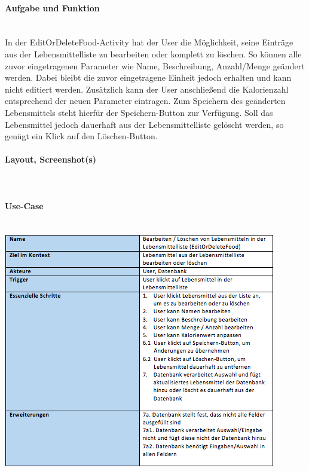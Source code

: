 \paragraph{Aufgabe und Funktion}\\
In der EditOrDeleteFood-Activity hat der User die Möglichkeit, seine Einträge aus der Lebensmittelliste zu bearbeiten oder komplett zu löschen. So können alle zuvor eingetragenen Parameter wie Name, Beschreibung, Anzahl/Menge geändert werden. Dabei bleibt die zuvor eingetragene Einheit jedoch erhalten und kann nicht editiert werden. Zusätzlich kann der User anschließend die Kalorienzahl entsprechend der neuen Parameter eintragen. Zum Speichern des geänderten Lebensmittels steht hierfür der Speichern-Button zur Verfügung. Soll das Lebensmittel jedoch dauerhaft aus der Lebensmittelliste gelöscht werden, so genügt ein Klick auf den Löschen-Button. 

\paragraph{Layout, Screenshot(s)}\\
\paragraph{Use-Case}$~~$\\
\newline
\includegraphics[scale=1]{img/usecaseeodfood}\\
